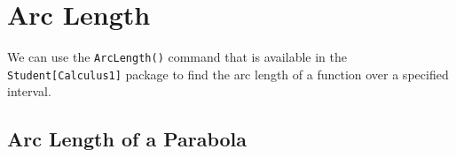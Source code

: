 \section{Arc Length}
We can use the \texttt{ArcLength()} command that is available in the \texttt{Student[Calculus1]} package to find the arc length of a function over a specified interval.


\subsection{Arc Length of a Parabola}

\begin{maplegroup}
\begin{mapleinput}
\end{mapleinput}
\end{maplegroup}

\begin{maplegroup}
\begin{mapleinput}
\end{mapleinput}
\mapleresult
\begin{maplelatex}
\end{maplelatex}
\end{maplegroup}

\begin{maplegroup}
\begin{mapleinput}
\end{mapleinput}
\mapleresult
\begin{maplelatex}
\end{maplelatex}
\end{maplegroup}

\begin{maplegroup}
\begin{mapleinput}
\end{mapleinput}
\mapleresult
\begin{maplelatex}
\end{maplelatex}
\end{maplegroup}
\clearpage
